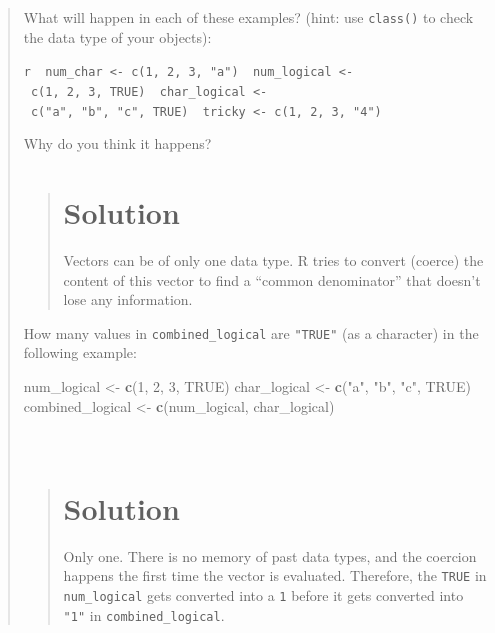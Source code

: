 \documentclass[]{book}
\newenvironment{Shaded}{\begin{snugshade}}{\end{snugshade}}
\newcommand{\KeywordTok}[1]{\textcolor[rgb]{0.13,0.29,0.53}{\textbf{#1}}}
\newcommand{\DecValTok}[1]{\textcolor[rgb]{0.00,0.00,0.81}{#1}}
\newcommand{\StringTok}[1]{\textcolor[rgb]{0.31,0.60,0.02}{#1}}
\newcommand{\OtherTok}[1]{\textcolor[rgb]{0.56,0.35,0.01}{#1}}
\newcommand{\NormalTok}[1]{#1}
\begin{document}
\begin{quote}
What will happen in each of these examples? (hint: use \texttt{class()}
to check the data type of your objects):

\texttt{r\ \ num\_char\ \textless{}-\ c(1,\ 2,\ 3,\ "a")\ \ num\_logical\ \textless{}-\ c(1,\ 2,\ 3,\ TRUE)\ \ char\_logical\ \textless{}-\ c("a",\ "b",\ "c",\ TRUE)\ \ tricky\ \textless{}-\ c(1,\ 2,\ 3,\ "4")}

Why do you think it happens?

\begin{quote}
\section{Solution}\label{solution-2}

Vectors can be of only one data type. R tries to convert (coerce) the
content of this vector to find a ``common denominator'' that doesn't
lose any information.
\end{quote}

How many values in \texttt{combined\_logical} are \texttt{"TRUE"} (as a
character) in the following example:

\begin{Shaded}
\begin{Highlighting}[]
\NormalTok{num_logical <-}\StringTok{ }\KeywordTok{c}\NormalTok{(}\DecValTok{1}\NormalTok{, }\DecValTok{2}\NormalTok{, }\DecValTok{3}\NormalTok{, }\OtherTok{TRUE}\NormalTok{)}
\NormalTok{char_logical <-}\StringTok{ }\KeywordTok{c}\NormalTok{(}\StringTok{"a"}\NormalTok{, }\StringTok{"b"}\NormalTok{, }\StringTok{"c"}\NormalTok{, }\OtherTok{TRUE}\NormalTok{)}
\NormalTok{combined_logical <-}\StringTok{ }\KeywordTok{c}\NormalTok{(num_logical, char_logical)}
\end{Highlighting}
\end{Shaded}

~

\begin{quote}
\section{Solution}\label{solution-3}

Only one. There is no memory of past data types, and the coercion
happens the first time the vector is evaluated. Therefore, the
\texttt{TRUE} in \texttt{num\_logical} gets converted into a \texttt{1}
before it gets converted into \texttt{"1"} in
\texttt{combined\_logical}.
\end{quote}
\end{quote}
\end{document}
